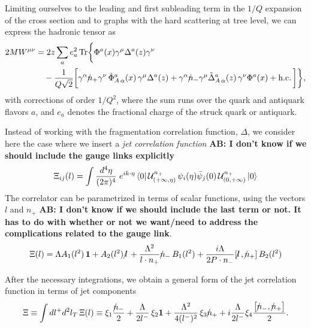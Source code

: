 \documentclass[preprintnumbers,floatfix,nofootinbib]{revtex4}
\newcommand{\todo}[1]{\marginpar{$\bullet$}\textbf{#1}}
\newcommand{\lslash}{l \hspace{-0.19cm} / \,}
\newcommand{\nslash}{n \hspace{-0.24cm} / \,}
\newcommand{\Tr}{\operatorname*{Tr}\nolimits} %
\newcommand{\de}{d}                    %
\begin{document}
Limiting ourselves
to the leading and first subleading term in the $1/Q$ expansion of the
cross section and to graphs with the hard scattering at tree level, we can
express the hadronic tensor as
\begin{equation} 
\begin{split} 
2M W^{\mu\nu} 
&= 2z \sum_a   e_a^2 
\Tr \biggl\{
  \Phi^a (x) \gamma^\mu \Delta^a (z) \gamma^\nu
\\
& \quad 
- \frac{1}{Q\sqrt{2}} \biggl[
  \gamma^\alpha \nslash_+ \gamma^\nu \,
  \tilde{\Phi}^a_{A\, \alpha}(x)\, \gamma^\mu \Delta^a(z) 
+ \gamma^\alpha \nslash_- \gamma^\mu
  \tilde{\Delta}^a_{A\, \alpha} (z)\, \gamma^\nu 
  \Phi^a (x)  
  + \mathrm{h.c.} \,\biggr] \biggr\},
\label{eq1}
\end{split} 
\end{equation} 
with corrections of order $1/Q^2$, where the sum runs over the quark
and antiquark flavors $a$, and $e_a$ denotes the fractional charge of
the struck quark or antiquark. 

Instead of working with the fragmentation correlation function, $\Delta$, we
consider here the case where we insert a {\em jet correlation function}
\todo{AB: I don't know if we should include the gauge links explicitly}
\begin{equation} 
\Xi_{ij}(l) =\int
  \frac{\de^4\eta}{(2\pi)^4}\; e^{i k \cdot \eta}\,
    \langle 0|\, {\cal U}^{n_+}_{(+\infty,\eta)}
\,\psi_i(\eta)
             \bar{\psi}_j(0)\,
{\cal U}^{n_+}_{(0,+\infty)}\,   |0 \rangle
\label{e:xifull}
\end{equation} 
The correlator can be parametrized in terms of scalar functions, using 
the
vectors $l$ and $n_+$ 
\todo{AB: I don't know if we should include the last term or not. It has to do
with whether or not we want/need to address the complications related to the
gauge link}.
\begin{equation}
\begin{split} 
\Xi(l) = \Lambda A_1(l^2)\,{\bm 1} + A_2(l^2)\,\lslash 
+ \frac{\Lambda^2}{l \cdot n_{+}} \nslash_- \, B_{1}(l^2)
+ \frac{i \Lambda}{2 P \cdot n_{-}} [\lslash,\nslash_+ ] \, B_{2}(l^2)
\end{split} 
\end{equation} 

After the necessary integrations, we obtain a general form of the jet
correlation function in terms of jet components
\begin{equation} 
\Xi \equiv \int d l^+ d^2 l_T \, \Xi(l) 
\equiv \xi_1 \frac{\nslash_-}{2}+ 
\frac{\Lambda}{2 l^-}\,\xi_2 {\bm 1}
+\frac{\Lambda^2}{4 (l^-)^2}\,\xi_3 \nslash_+
+ i \frac{\Lambda}{2 l^-} \xi_4 
\frac{ \bigl[\nslash_-, \nslash_+ \bigr]}{2}.
\end{equation} 
\end{document}
